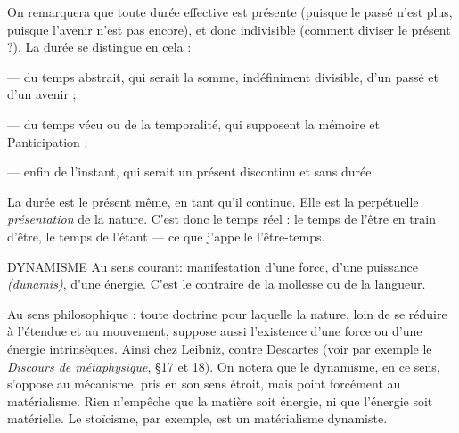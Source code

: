 On remarquera que toute durée effective est présente (puisque le passé n’est
plus, puisque l’avenir n’est pas encore), et donc indivisible (comment diviser le
présent ?). La durée se distingue en cela :

— du temps abstrait, qui serait la somme, indéfiniment divisible, d’un passé
et d’un avenir ;

— du temps vécu ou de la temporalité, qui supposent la mémoire et
Panticipation ;

— enfin de l'instant, qui serait un présent discontinu et sans durée.

La durée est le présent même, en tant qu’il continue. Elle est la perpétuelle
{\it présentation} de la nature. C’est donc le temps réel : le temps de l’être en train
d’être, le temps de l’étant — ce que j'appelle l’être-temps.

DYNAMISME Au sens courant: manifestation d’une force, d’une puissance
{\it (dunamis)}, d’une énergie. C’est le contraire de la mollesse
ou de la langueur.

Au sens philosophique : toute doctrine pour laquelle la nature, loin de se
réduire à l’étendue et au mouvement, suppose aussi l’existence d’une force ou
d’une énergie intrinsèques. Ainsi chez Leibniz, contre Descartes (voir par
exemple le {\it Discours de métaphysique}, \S 17 et 18). On notera que le dynamisme,
en ce sens, s'oppose au mécanisme, pris en son sens étroit, mais point forcément
au matérialisme. Rien n'empêche que la matière soit énergie, ni que
l'énergie soit matérielle. Le stoïcisme, par exemple, est un matérialisme dynamiste.

